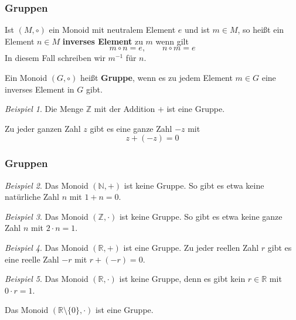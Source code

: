 \documentclass[hyperref={pdfpagelabels=false}]{beamer}
\theoremstyle{plain}%
\theoremstyle{definition}
\theoremstyle{remark}
\newtheorem*{beispiel}{Beispiel}
\def \R{\mathbb R}
\def \Z{\mathbb Z}
\begin{document}
\begin{frame}
\frametitle{Gruppen}

\begin{definition} Ist $(M, \circ)$ ein Monoid mit neutralem Element $e$ und ist $m \in M$, so heißt 
ein Element $n \in M$ \textbf{inverses Element} zu $m$ wenn gilt
  	$$ m \circ n  = e, \qquad n \circ m = e $$
In diesem Fall schreiben wir $m^{-1}$ für $n$.
\pause 

Ein Monoid $(G, \circ)$ heißt \textbf{Gruppe}, wenn es zu jedem Element $m \in G$ eine 
inverses Element in $G$ gibt.
\end{definition}

\pause 

\begin{beispiel}
Die Menge $\Z$ mit der Addition $+$ ist eine Gruppe. 

\pause 

Zu jeder ganzen Zahl $z$ gibt es eine ganze Zahl $-z$ mit 
	$$ z + (-z) = 0 $$
\end{beispiel}

\end{frame}

\begin{frame}
\frametitle{Gruppen}

\begin{beispiel} Das Monoid $(\mathbb N, +)$ ist keine Gruppe. So gibt es etwa keine natürliche Zahl $n$ mit
$1 + n = 0$. \end{beispiel}

\pause 

\begin{beispiel} Das Monoid $(\mathbb Z, \cdot)$ ist keine Gruppe. So gibt es etwa keine ganze Zahl $n$ mit
$2 \cdot  n = 1$. \end{beispiel}

\pause 

\begin{beispiel} Das Monoid $(\mathbb R, +)$ ist eine Gruppe. Zu jeder reellen Zahl $r$ gibt es 
eine reelle Zahl $-r$ mit $ r + (-r) = 0 $. \end{beispiel}

\pause 


\begin{beispiel} Das Monoid $(\mathbb R, \cdot)$ ist keine Gruppe, denn es gibt kein $r \in \R$ mit
$0 \cdot  r = 1$.

\pause 
Das Monoid $(\R \setminus \{ 0 \}, \cdot)$ ist eine Gruppe. %
\end{beispiel}
\end{frame}
\end{document}
